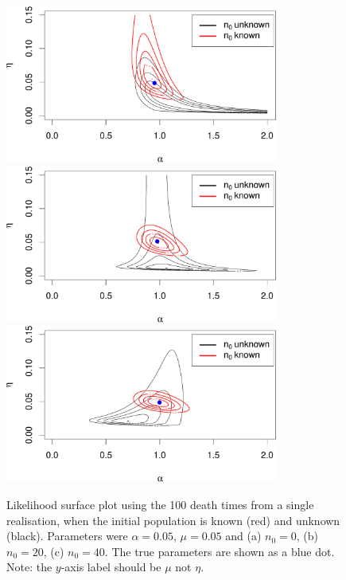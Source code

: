 \documentclass[11pt,BCOR2mm,DIV14]{scrartcl}
\begin{document}
\begin{figure}[t]
\centering
\includegraphics[width=0.8\textwidth]{graphs/n0_0-crop}
\includegraphics[width=0.8\textwidth]{graphs/n0_20-crop}
\includegraphics[width=0.8\textwidth]{graphs/n0_40-crop}
\caption{Likelihood surface plot using the 100 death times from a single realisation, when the initial population is known (red) and unknown (black). Parameters were $\alpha = 0.05$, $\mu=0.05$ and (a) $n_0=0$, (b) $n_0 = 20$, (c) $n_0 = 40$. The true parameters are shown as a blue dot.
Note: the $y$-axis label should be $\mu$ not $\eta$.}\label{F2}
\end{figure}
\end{document}
